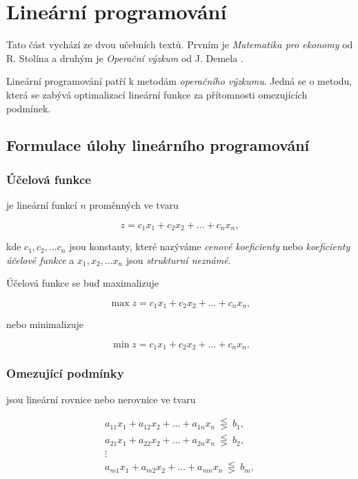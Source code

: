\section{Lineární programování}
Tato část vychází ze dvou učebních textů. Prvním je \textit{Matematika pro ekonomy} od R. Stolína \cite{matematika_pro_ekonomy} a druhým je \textit{Operační výzkum} od J. Demela \cite{demel}.

Lineární programování patří k metodám \textit{operačního výzkumu}.
Jedná se o metodu, která se zabývá optimalizací lineární funkce za přítomnosti omezujících podmínek.

\subsection{Formulace úlohy lineárního programování}

\subsubsection{Účelová funkce}

je lineární funkcí $n$ proměnných ve tvaru

\begin{equation} \label{objective}
    z = c_1x_1 + c_2x_2 + \ldots + c_nx_n ,
\end{equation}


kde $c_1, c_2, \ldots c_n$ jsou konstanty, které nazýváme \textit{cenové koeficienty} nebo \textit{koeficienty účelové funkce} a 
$x_1, x_2, \ldots x_n$ jsou \textit{strukturní neznámé}.

Účelová funkce se buď maximalizuje

\begin{equation} \label{max_objective}
    \max z = c_1x_1 + c_2x_2 + \ldots + c_nx_n ,
\end{equation}

nebo minimalizuje

\begin{equation} \label{min_objective}
    \min z = c_1x_1 + c_2x_2 + \ldots + c_nx_n .
\end{equation}

\subsubsection{Omezující podmínky}

jsou lineární rovnice nebo nerovnice ve tvaru

\begin{equation} \label{constraints}
    \begin{gathered}
        a_{11}x_1 + a_{12}x_2 + \ldots + a_{1n}x_n \ \lesseqgtr \ b_1, \\
        a_{21}x_1 + a_{22}x_2 + \ldots + a_{2n}x_n \ \lesseqgtr \ b_2, \\
        \vdots \\
        a_{m1}x_1 + a_{m2}x_2 + \ldots + a_{mn}x_n \ \lesseqgtr \ b_m,
    \end{gathered}
\end{equation}

